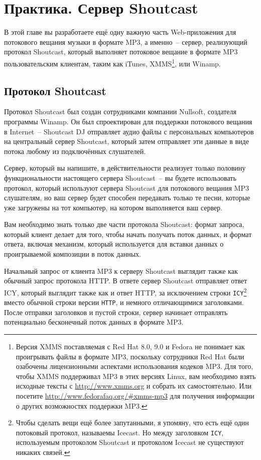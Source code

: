 \chapter{Практика. Сервер Shoutcast}
\label{ch:28}

В этой главе вы разработаете ещё одну важную часть Web-приложения для потокового вещания
музыки в формате MP3, а именно~-- сервер, реализующий протокол Shoutcast, который
выполняет потоковое вещание в формате MP3 пользовательским клиентам, таким как iTunes,
XMMS\footnote{Версия XMMS поставляемая с Red Hat 8.0, 9.0 и Fedora не понимает как
  проигрывать файлы в формате MP3, поскольку сотрудники Red Hat были озабочены
  лицензионными аспектами использования кодеков MP3.  Для того, чтобы XMMS поддерживал MP3
  в этих версиях Linux, вам необходимо взять исходные тексты с \url{http://www.xmms.org} и
  собрать их самостоятельно.  Или посетите \url{http://www.fedorafaq.org/#xmms-mp3} для
  получения информации о других возможностях поддержки MP3.}, или Winamp.

\section{Протокол Shoutcast}

Протокол Shoutcast был создан сотрудниками компании Nullsoft, создателя программы
Winamp. Он был спроектирован для поддержки потокового вещания в Internet~-- Shoutcast DJ
отправляет аудио файлы с персональных компьютеров на центральный сервер Shoutcast, который
затем отправляет эти данные в виде потока любому из подключённых слушателей.

Сервер, который вы напишите, в действительности реализует только половину функциональности
настоящего сервера Shoutcast~-- вы будете использовать протокол, который используют
сервера Shoutcast для потокового вещания MP3 слушателям, но ваш сервер будет способен
передавать только те песни, которые уже загружены на тот компьютер, на котором выполняется
ваш сервер.

Вам необходимо знать только две части протокола Shoutcast: формат запроса, который клиент
делает для того, чтобы начать получать поток данных, и формат ответа, включая механизм,
который используется для вставки данных о проигрываемой композиции в поток данных.

Начальный запрос от клиента MP3 к серверу Shoutcast выглядит также как обычный запрос
протокола HTTP.  В ответе сервер Shoutcast отправляет ответ ICY, который выглядит также
как и ответ HTTP, за исключением строки \lstinline{ICY}\footnote{Чтобы сделать вещи ещё более
  запутанными, я упомяну, что есть ещё один потоковый протокол, называемы Icecast. Но
  между заголовком \lstinline{ICY}, используемым протоколом Shoutcast и протоколом Icecast не
  существуют никаких связей.} вместо обычной строки версии \lstinline{HTTP}, и немного
отличающимися заголовками. После отправки заголовков и пустой строки, сервер начинает
отправлять потенциально бесконечный поток данных в формате MP3.


